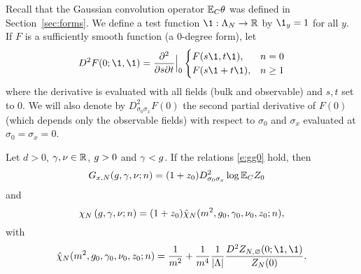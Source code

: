 Recall that the Gaussian convolution operator $\mathbb{E}_C\theta$ was defined in
Section~\ref{sec:forms}. We define a test function $\1: \Lambda_N \to \R$ by
$\1_y=1$ for all $y$. If $F$ is a sufficiently smooth function (a $0$-degree form),
let
\begin{equation}
D^2 F(0; \1, \1)
  =
\ddp{^2}{s\partial t}\Big|_0
\begin{cases}
F(s \1, t\1), & n = 0 \\
F(s \1 + t\1), & n \ge 1
\end{cases}
\end{equation}
where the derivative is evaluated with all fields (bulk and observable) and $s, t$ set to $0$.
We will also denote by $D^2_{\sigma_0\sigma_x} F(0)$ the second partial derivative of $F(0)$
(which depends only the observable fields)
with respect to $\sigma_0$ and $\sigma_x$ evaluated at $\sigma_0 = \sigma_x = 0$.

\begin{prop}
\label{prop:intrep}
Let $d > 0$, $\gamma, \nu \in {\mathbb R}$, $g >0$ and $\gamma <g$.
If the relations \eqref{e:gg0} hold, then
\begin{align}
\label{e:generating-fn}
G_{x,N}(g, \gamma, \nu; n)
	&=
(1+z_0)
D^2_{\sigma_0\sigma_x}
\log \mathbb{E}_C Z_0
\end{align}
and
\begin{equation}
\label{e:chichibar}
\chi_N\left(g,\gamma,\nu; n\right)
	=
(1+z_0)\hat\chi_N(m^2, g_0, \gamma_0, \nu_0, z_0; n),
\end{equation}
with
\begin{equation}
\label{e:chibarm}
\hat\chi_N(m^2, g_0, \gamma_0, \nu_0, z_0; n)
	=
\frac{1}{m^2}
	+
\frac{1}{m^4} \frac{1}{|\Lambda|} \frac{D^2 Z_{N,\varnothing}(0; \1, \1)}{Z_N(0)}.
\end{equation}
\end{prop}

